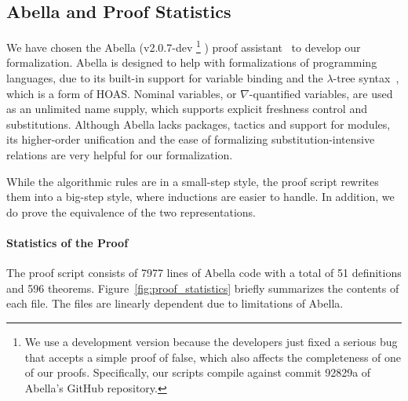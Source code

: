\subsection{Abella and Proof Statistics}

We have chosen the Abella (v2.0.7-dev
\footnote{We use a development version because the developers
just fixed a serious bug that accepts a simple proof of false,
which also affects the completeness of one of our proofs.
Specifically, our scripts compile against commit 92829a of Abella's GitHub repository.}
) proof assistant~\cite{AbellaDesc} to develop our formalization.
Abella is designed to help with formalizations of programming languages,
due to its built-in support for variable binding and
the $\lambda$-tree syntax~\cite{miller2000abstract}, which is a form of HOAS.
Nominal variables, or $\nabla$-quantified variables, are used as an unlimited name supply,
which supports explicit freshness control and substitutions.
Although Abella lacks packages, tactics and support for modules,
its higher-order unification and the ease of formalizing substitution-intensive relations
are very helpful for our formalization.

While the algorithmic rules are in a small-step style,
the proof script rewrites them into a big-step style,
where inductions are easier to handle.
In addition, we do prove the equivalence of the two representations.

\paragraph{Statistics of the Proof}
The proof script consists of 7977 lines of Abella code with a total of
51 definitions and 596 theorems.
Figure~\ref{fig:proof_statistics} briefly summarizes the contents of each file.
The files are linearly dependent due to limitations of Abella.


